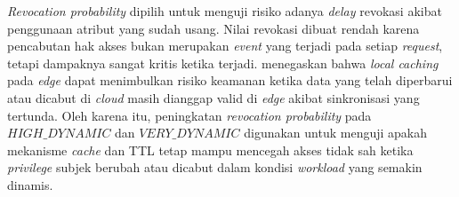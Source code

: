 \textit{Revocation probability} dipilih untuk menguji risiko adanya \textit{delay} revokasi akibat penggunaan atribut yang sudah usang. Nilai revokasi dibuat rendah karena pencabutan hak akses bukan merupakan \textit{event} yang terjadi pada setiap \textit{request}, tetapi dampaknya sangat kritis ketika terjadi. \textcite{wang_edge-enabled_2025} menegaskan bahwa \textit{local caching} pada \textit{edge} dapat menimbulkan risiko keamanan ketika data yang telah diperbarui atau dicabut di \textit{cloud} masih dianggap valid di \textit{edge} akibat sinkronisasi yang tertunda. Oleh karena itu, peningkatan \textit{revocation probability} pada $HIGH\_DYNAMIC$ dan $VERY\_DYNAMIC$ digunakan untuk menguji apakah mekanisme \textit{cache} dan TTL tetap mampu mencegah akses tidak sah ketika \textit{privilege} subjek berubah atau dicabut dalam kondisi \textit{workload} yang semakin dinamis.